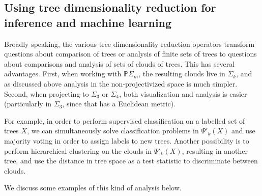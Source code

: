 \documentclass[a4paper,11pt]{article}
\begin{document}
\subsection{Using tree dimensionality reduction for inference and machine learning}

Broadly speaking, the various tree dimensionality reduction operators transform questions about comparison of trees or analysis of finite sets of trees to questions about comparisons and analysis of sets of clouds of trees.
This has several advantages.
First, when working with $\mathbb{P}\Sigma_m$, the resulting clouds live in $\Sigma_k$, and as discussed above analysis in the non-projectivized space is much simpler.
Second, when projecting to $\Sigma_3$ or $\Sigma_4$, both visualization and analysis is easier (particularly in $\Sigma_3$, since that has a Euclidean metric).

For example, in order to perform supervised classification on a labelled set of trees $X$, we can simultaneously solve classification problems in $\Psi'_k(X)$ and use majority voting in order to assign labels to new trees.
Another possibility is to perform hierarchical clustering on the clouds in $\Psi'_k(X)$, resulting in another tree, and use the distance in tree space as a test statistic to discriminate between clouds.

We discuss some examples of this kind of analysis below.

\end{document}
